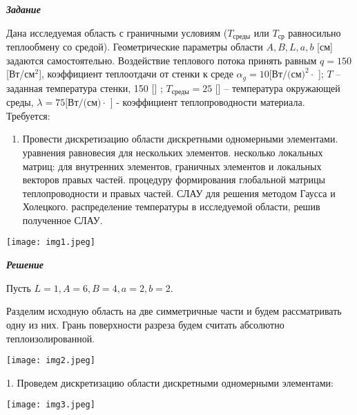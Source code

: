 \documentclass[a4paper, 12pt]{article}
\begin{document}
\begin{center}
\textbf{\textit{Задание}}
\end{center}

Дана исследуемая область с граничными условиям ($T_{\text{среды}}$ или $T_{\text{ср}}$ равносильно теплообмену со средой). Геометрические параметры области $A, B, L, a, b$ [см] задаются самостоятельно. Воздействие теплового потока принять равным  $q = 150$ [Вт/$\text{см}^2$], коэффициент теплоотдачи от стенки к среде 
$\alpha_g = 10 [\text{Вт/(см)}^2\cdot$ \celsius]; $T$ – заданная температура стенки, 150 [\celsius] ;  $T_{\text{среды}} = 25$ [\celsius] -- температура окружающей среды,  $\lambda = 75 [\text{Вт/(см)}\cdot$ \celsius]  - коэффициент теплопроводности материала. \\

Требуется:
\begin{enumerate}
\item	Провести дискретизацию области дискретными одномерными элементами.
 уравнения равновесия для нескольких элементов.
 несколько локальных матриц: для внутренних элементов, граничных элементов и локальных векторов правых частей.
 процедуру формирования глобальной матрицы теплопроводности и правых частей.
 СЛАУ для решения методом Гаусса и Холецкого.
 распределение температуры в исследуемой области, решив полученное СЛАУ. 
\end{enumerate}

\texttt{[image: img1.jpeg]}

\newpage

\begin{center}
\textbf{\textit{Решение}}
\end{center}

Пусть $L=1, A=6, B=4, a=2, b=2$.

Разделим исходную область на две симметричные части и будем рассматривать одну из них. Грань
поверхности разреза будем считать абсолютно теплоизолированной.

\begin{center}
\texttt{[image: img2.jpeg]}
\end{center}

1. Проведем дискретизацию области дискретными одномерными элементами:

\begin{center}
\texttt{[image: img3.jpeg]}
\end{center}
\end{document}
